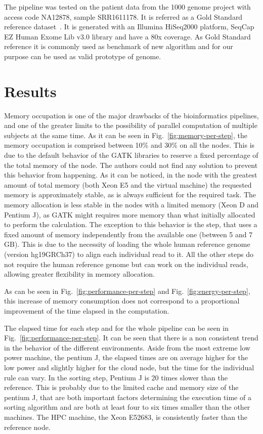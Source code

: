 \documentclass{standalone}
\begin{document}
The pipeline was tested on the patient data from the 1000 genome project with access code NA12878, sample SRR1611178.
It is referred as a Gold Standard reference dataset~\cite{Zook2014}.
It is generated with an Illumina HiSeq2000 platform, SeqCap EZ Human Exome Lib v3.0 library and have a 80x coverage.
As Gold Standard reference it is commonly used as benchmark of new algorithm and for our purpose can be used as valid prototype of genome.


\section*{Results}

Memory occupation is one of the major drawbacks of the bioinformatics pipelines, and one of the greater limits to the possibility of parallel computation of multiple subjects at the same time.
As it can be seen in Fig.~\ref{fig:memory-per-step}, the memory occupation is comprised between 10\% and 30\% on all the nodes.
This is due to the default behavior of the GATK libraries to reserve a fixed percentage of the total memory of the node.
The authors could not find any solution to prevent this behavior from happening.
As it can be noticed, in the node with the greatest amount of total memory (both Xeon E5 and the virtual machine) the requested memory is approximately stable, as is always sufficient for the required task.
The memory allocation is less stable in the nodes with a limited memory (Xeon D and Pentium J), as GATK might requires more memory than what initially allocated to perform the calculation.
The exception to this behavior is the  step, that uses a fixed amount of memory independently from the available one (between 5 and 7 GB).
This is due to the necessity of loading the whole human reference genome (version hg19GRCh37) to align each individual read to it.
All the other steps do not require the human reference genome but can work on the individual reads, allowing greater flexibility in memory allocation.

As can be seen in Fig.~\ref{fig:performance-per-step} and Fig.~\ref{fig:energy-per-step}, this increase of memory consumption does not correspond to a proportional improvement of the time elapsed in the computation.

The elapsed time for each step and for the whole pipeline can be seen in Fig.~\ref{fig:performance-per-step}.
It can be seen that there is a non consistent trend in the behavior of the different environments.
Aside from the most extreme low power machine, the pentium J, the elapsed times are on average higher for the low power and slightly higher for the cloud node, but the time for the individual rule can vary.
In the sorting step, Pentium J is 20 times slower than the reference.
This is probably due to the limited cache and memory size of the pentium J, that are both important factors determining the execution time of a sorting algorithm and are both at least four to six times smaller than the other machines.
The HPC machine, the Xeon E52683, is consistently faster than the reference node.
\end{document}
